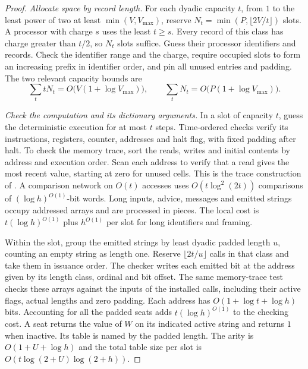 \begin{proof}
\emph{Allocate space by record length.}
For each dyadic capacity $t$, from $1$ to the least power of two
at least $\min(V,V_{\max})$, reserve
$N_t=\min(P,\lfloor 2V/t\rfloor)$ slots. A processor with charge $s$
uses the least $t\ge s$. Every record of this class has charge
greater than $t/2$, so $N_t$ slots suffice. Guess their processor
identifiers and records. Check the identifier range and the charge,
require occupied slots to form an increasing prefix in identifier
order, and pin all unused entries and padding. The two relevant
capacity bounds are
\begin{equation}\label{eq:asm-seats}
 \sum_t tN_t=O\bigl(V(1+\log V_{\max})\bigr),\qquad
 \sum_t N_t=O\bigl(P(1+\log V_{\max})\bigr).
\end{equation}

\emph{Check the computation and its dictionary arguments.}
In a slot of capacity $t$, guess the deterministic execution for at
most $t$ steps. Time-ordered checks verify its instructions, registers,
counter, addresses and halt flag, with fixed padding after halt. To
check the memory trace, sort the reads, writes and initial contents by
address and execution order. Scan each address to verify that a read gives the
most recent value, starting at zero for unused cells. This is the
trace construction of \citet[Section~]{oaG}.
A comparison network on $O(t)$ accesses uses $O(t\log^2(2t))$
comparisons of $(\log h)^{O(1)}$-bit words. Long inputs, advice,
messages and emitted strings occupy addressed arrays and are
processed in pieces. The local cost is $t(\log h)^{O(1)}$ plus
$h^{O(1)}$ per slot for long identifiers and framing.

Within the slot, group the emitted strings by least dyadic padded
length $u$, counting an empty string as length one. Reserve
$\lfloor2t/u\rfloor$ calls in that class and take them in issuance
order. The checker writes each emitted bit at the address given by
its length class, ordinal and bit offset. The same memory-trace test
checks these arrays against the inputs of the installed calls,
including their active flags, actual lengths and zero padding. Each
address has $O(1+\log t+\log h)$ bits. Accounting for all the padded
seats adds $t(\log h)^{O(1)}$ to the checking cost. A seat returns
the value of $W$ on its indicated active string and returns $1$ when
inactive. Its table is named by the padded length. The arity is
$O(1+U+\log h)$ and the total table size per slot is
$O(t\log(2+U)\log(2+h))$.


\end{proof}
